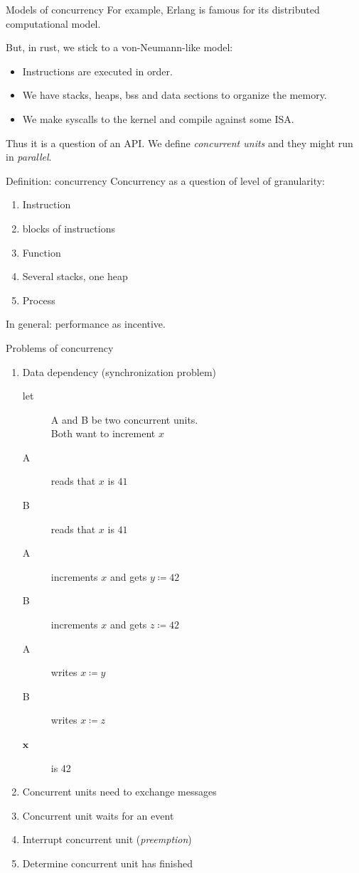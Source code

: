 \documentclass{beamer}
\begin{document}
\begin{frame}[fragile]{Models of concurrency}
  For example, Erlang is famous for its distributed computational model.

  But, in rust, we stick to a von-Neumann-like model:
  \begin{itemize}
    \item Instructions are executed in order.
    \item We have stacks, heaps, bss and data sections to organize the memory.
    \item We make syscalls to the kernel and compile against some ISA.
  \end{itemize}
  Thus it is a question of an API. We define \emph{concurrent units} and they might run in \emph{parallel}.
\end{frame}

\begin{frame}[fragile]{Definition: concurrency}
  Concurrency as a question of level of granularity:
  \begin{enumerate}
    \item Instruction
    \item blocks of instructions
    \item Function
    \item Several stacks, one heap
    \item Process
  \end{enumerate}
  In general: performance as incentive.
\end{frame}

\begin{frame}[fragile]{Problems of concurrency}
  \begin{enumerate}
    \item Data dependency (synchronization problem)
      \begin{description}
        \item[let] A and B be two concurrent units. \\
          Both want to increment $x$
        \item[A] reads that $x$ is $41$
        \item[B] reads that $x$ is $41$
        \item[A] increments $x$ and gets $y \coloneqq 42$
        \item[B] increments $x$ and gets $z \coloneqq 42$
        \item[A] writes $x \coloneqq y$
        \item[B] writes $x \coloneqq z$
        \item[$\mathbf x$] is 42
      \end{description}
    \item Concurrent units need to exchange messages
    \item Concurrent unit waits for an event
    \item Interrupt concurrent unit (\emph{preemption})
    \item Determine concurrent unit has finished
  \end{enumerate}
\end{frame}
\end{document}

